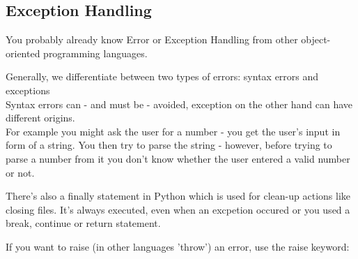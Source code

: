   
  \subsection{Exception Handling}
    You probably already know Error or Exception Handling from other object-oriented
    programming languages.
    
    Generally, we differentiate between two types of errors: syntax errors and exceptions \\
    Syntax errors can - and must be - avoided, exception on the other hand can have different
    origins. \\
    For example you might ask the user for a number - you get the user's input in form
    of a string. You then try to parse the string - however, before trying to parse a number from
    it you don't know whether the user entered a valid number or not.

    There's also a finally statement in Python which is used for clean-up actions like
    closing files. It's always executed, even when an excpetion occured or you used a break,
    continue or return statement.
    

    If you want to raise (in other languages 'throw') an error, use the raise keyword:

